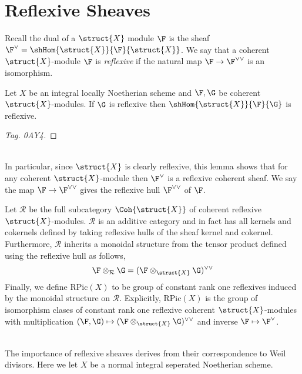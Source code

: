 \documentclass[12pt]{article}
\begin{document}
\section{Reflexive Sheaves}

\newcommand{\RPic}[1]{\mathrm{RPic}\left( #1 \right)}
\renewcommand{\R}{\mathcal{R}}

\begin{defn}
Recall the dual of a $\struct{X}$ module $\F$ is the sheaf $\F^\vee = \shHom{\struct{X}}{\F}{\struct{X}}$. We say that a coherent $\struct{X}$-module $\F$ is \textit{reflexive} if the natural map $\F \to \F^{\vee \vee}$ is an isomorphism. 
\end{defn}

\begin{lemma}
Let $X$ be an integral locally Noetherian scheme and $\F, \G$ be coherent $\struct{X}$-modules. If $\G$ is reflexive then $\shHom{\struct{X}}{\F}{\G}$ is reflexive.
\end{lemma}

\begin{proof}
[Tag. 0AY4]
\end{proof}
\noindent\\
In particular, since $\struct{X}$ is clearly reflexive, this lemma shows that for any coherent $\struct{X}$-module then $\F^\vee$ is a reflexive coherent sheaf. We say the map $\F \to \F^{\vee \vee}$ gives the reflexive hull $\F^{\vee \vee}$ of $\F$.

\begin{defn}
Let $\R$ be the full subcategory $\Coh{\struct{X}}$ of coherent reflexive $\struct{X}$-modules. $\R$ is an additive category   and in fact has all kernels and cokernels defined by taking reflexive hulls of the sheaf kernel and cokernel. Furthermore, $\R$ inherits a monoidal structure from the tensor product defined using the reflexive hull as follows,
\[ \F \otimes_\R \G = (\F \otimes_{\struct{X}} \G)^{\vee \vee} \]
Finally, we define $\RPic{X}$ to be group of constant rank one reflexives induced by the monoidal structure on $\R$. Explicitly, $\RPic{X}$ is the group of isomorphism clases of constant rank one reflexive coherent $\struct{X}$-modules with multiplication $(\F, \G) \mapsto (\F \otimes_{\struct{X}} \G)^{\vee \vee}$ and inverse $\F \mapsto \F^\vee$. 
\end{defn}
\noindent\\
The importance of reflexive sheaves derives from their correspondence to Weil divisors. Here we let $X$ be a normal integral seperated Noetherian scheme. 
\end{document}
